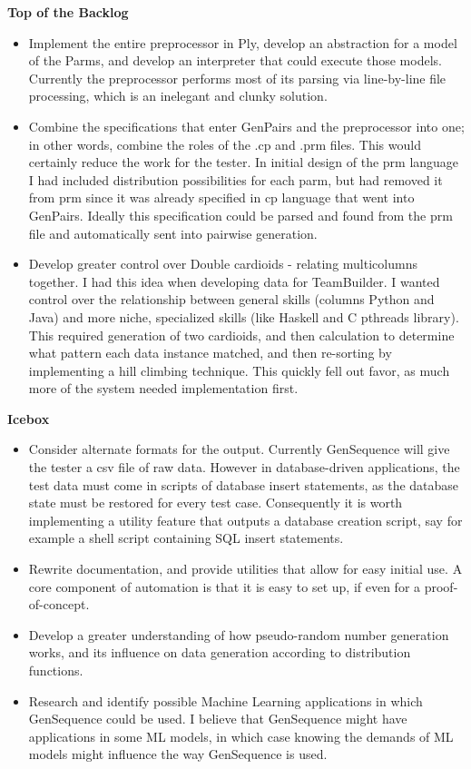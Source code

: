 \textbf{Top of the Backlog}
\begin{itemize}
\item Implement the entire preprocessor in Ply, develop an abstraction for a model of the Parms, and develop an interpreter that could execute those models. Currently the preprocessor performs most of its parsing via line-by-line file processing, which is an inelegant and clunky solution.
\item Combine the specifications that enter GenPairs and the preprocessor into one; in other words, combine the roles of the .cp and .prm files. This would certainly reduce the work for the tester. In initial design of the prm language I had included distribution possibilities for each parm, but had removed it from prm since it was already specified in cp language that went into GenPairs. Ideally this specification could be parsed and found from the prm file and automatically sent into pairwise generation.
\item Develop greater control over Double cardioids - relating multicolumns together. I had this idea when developing data for TeamBuilder. I wanted control over the relationship between general skills (columns Python and Java) and more niche, specialized skills (like Haskell and C pthreads library). This required generation of two cardioids, and then calculation to determine what pattern each data instance matched, and then re-sorting by implementing a hill climbing technique. This quickly fell out favor, as much more of the system needed implementation first.
\end{itemize}

\textbf{Icebox}
\begin{itemize}
\item Consider alternate formats for the output. Currently GenSequence will give the tester a csv file of raw data. However in database-driven applications, the test data must come in scripts of database insert statements, as the database state must be restored for every test case. Consequently it is worth implementing a utility feature that outputs a database creation script, say for example a shell script containing SQL insert statements.
\item Rewrite documentation, and provide utilities that allow for easy initial use. A core component of automation is that it is easy to set up, if even for a proof-of-concept.
\item Develop a greater understanding of how pseudo-random number generation works, and its influence on data generation according to distribution functions.
\item Research and identify possible Machine Learning applications in which GenSequence could be used. I believe that GenSequence might have applications in some ML models, in which case knowing the demands of ML models might influence the way GenSequence is used.
\end{itemize}

